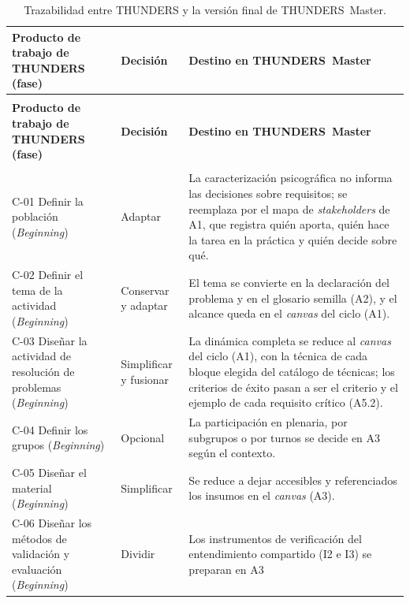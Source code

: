\documentclass[12pt,letterpaper,oneside]{report}
\begin{document}
{\footnotesize
\setlength{\tabcolsep}{4pt}
\renewcommand{\arraystretch}{1.08}
\begin{xltabular}{\textwidth}{@{}>{\raggedright\arraybackslash}p{0.25\textwidth}
                                >{\raggedright\arraybackslash}p{0.14\textwidth}
                                >{\raggedright\arraybackslash}X@{}}
\caption{Trazabilidad entre THUNDERS y la versión final de THUNDERS~Master.\label{tab:thunders_traceability}}\\
\toprule
\textbf{Producto de trabajo de THUNDERS (fase)} & \textbf{Decisión} &
\textbf{Destino en THUNDERS~Master} \\
\midrule
\endfirsthead
{}\\
\toprule
\textbf{Producto de trabajo de THUNDERS (fase)} & \textbf{Decisión} &
\textbf{Destino en THUNDERS~Master} \\
\midrule
\endhead
\midrule
{}\\
\endfoot
\bottomrule
\endlastfoot
C-01 Definir la población (\textit{Beginning}) & Adaptar
& La caracterización psicográfica no informa las decisiones sobre requisitos;
  se reemplaza por el mapa de \textit{stakeholders} de A1, que registra quién
  aporta, quién hace la tarea en la práctica y quién decide sobre qué. \\
C-02 Definir el tema de la actividad (\textit{Beginning}) & Conservar y adaptar
& El tema se convierte en la declaración del problema y en el glosario semilla
  (A2), y el alcance queda en el \textit{canvas} del ciclo (A1). \\
C-03 Diseñar la actividad de resolución de problemas (\textit{Beginning})
& Simplificar y fusionar
& La dinámica completa se reduce al \textit{canvas} del ciclo (A1), con la
  técnica de cada bloque elegida del catálogo de técnicas; los criterios de
  éxito pasan a ser el criterio y el ejemplo de cada requisito crítico
  (A5.2). \\
C-04 Definir los grupos (\textit{Beginning}) & Opcional
& La participación en plenaria, por subgrupos o por turnos se decide en A3 según
  el contexto. \\
C-05 Diseñar el material (\textit{Beginning}) & Simplificar
& Se reduce a dejar accesibles y referenciados los insumos en el
  \textit{canvas} (A3). \\
C-06 Diseñar los métodos de validación y evaluación (\textit{Beginning}) & Dividir
& Los instrumentos de verificación del entendimiento compartido (I2 e I3) se preparan en A3

\end{xltabular}}
\end{document}
